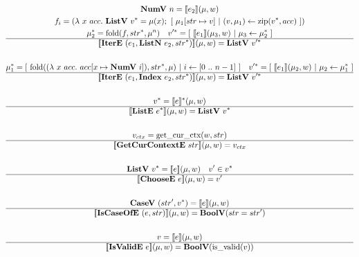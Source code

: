 \begin{gather*}
%
\newline \\
  \numv ~ n = \sem{e_2}(\mu, w) \\
  f_i =
    (\lambda ~ x ~ acc. ~
      \listv ~ \seq v = \mu(x); ~
      [ ~ \mu_1[str \mapsto v] ~ | ~ (v, \mu_1) \leftarrow \zip (\seq v, acc) ~ ]
    )
  \\
  \seq{\mu_2} = \fold(f, \seq{str}, \mu^n) \quad
  \seq{v'} = [ ~ \sem{e_1}(\mu_3, w) ~ | ~ \mu_3 \leftarrow \seq {\mu_2} ~ ] \\
  \hline
  \sem{\itere ~ (e_1, \listniter ~ e_2, \seq{str})}(\mu, w) = \listv ~ \seq{v'} \\
%
\newline \\
  \seq{\mu_1} =
    [ ~
      \fold(
        (\lambda ~ x ~ acc. ~ acc[x \mapsto \numv ~ i]),
        \seq{str},
        \mu
      )
    ~ | ~
      i \leftarrow [0 ~ .. ~ n-1]
    ~ ]
  \quad
  \seq{v'} = [ ~ \sem{e_1}(\mu_2, w) ~ | ~ \mu_2 \leftarrow \seq {\mu_1} ~ ] \\
  \hline
  \sem{\itere ~ (e_1, \listidxiter ~ e_2, \seq{str})}(\mu, w) = \listv ~ \seq{v'} \\
%
\newline \\
  \seq{v} = \seq{\sem{e}}(\mu, w) \\
  \hline
  \sem{\liste ~ \seq{e}}(\mu, w) = \listv ~ \seq{v} \\
%
\newline \\
  v_{ctx} = \getcurctx(w, str) \\
  \hline
  \sem{\getcurctxe ~ str}(\mu, w) = v_{ctx} \\
%
\newline \\
  \listv ~ \seq{v} = \sem{e}(\mu, w) \quad
  v' \in \seq{v} \\
  \hline
  \sem{\choosee ~ e}(\mu, w) = v' \\
%
\newline \\
  \casev ~ (str', \seq{v}) = \sem{e}(\mu, w) \\
  \hline
  \sem{\iscaseofe ~ (e, str)}(\mu, w) = \boolv (str = str') \\
%
\newline \\
  v = \sem{e}(\mu, w) \\
  \hline
  \sem{\isvalide ~ e}(\mu, w) = \boolv (\isvalid(v)) \\

\end{gather*}
